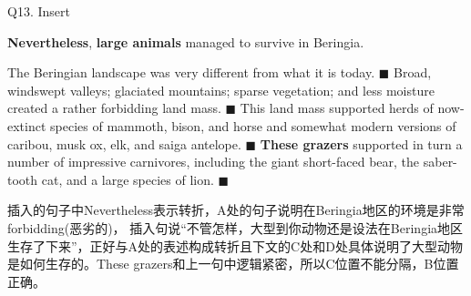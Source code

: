 \begin{blk}
    \begin{qst}
        Q13. Insert
    \end{qst}

    \begin{chc}
        \textbf{Nevertheless}, \textbf{large animals} managed to survive in Beringia.
    \end{chc}

    \begin{psgq}
        The Beringian landscape was very different from what it is today. $\blacksquare$ Broad, windswept valleys; glaciated mountains; sparse vegetation; and less moisture created a rather forbidding land mass. $\blacksquare$ This land mass supported herds of now-extinct species of mammoth, bison, and horse and somewhat modern versions of caribou, musk ox, elk, and saiga antelope. $\blacksquare$ \textbf{These grazers} supported in turn a number of impressive carnivores, including the giant short-faced bear, the saber-tooth cat, and a large species of lion. $\blacksquare$
    \end{psgq}

    \begin{nlz}
        插入的句子中Nevertheless表示转折，A处的句子说明在Beringia地区的环境是非常forbidding(恶劣的)， 插入句说“不管怎样，大型到你动物还是设法在Beringia地区生存了下来”，正好与A处的表述构成转折且下文的C处和D处具体说明了大型动物是如何生存的。These grazers和上一句中逻辑紧密，所以C位置不能分隔，B位置正确。
    \end{nlz}
\end{blk}
